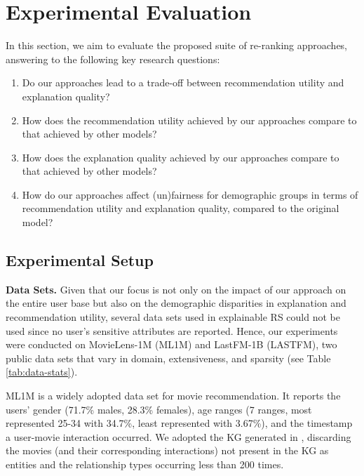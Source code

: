 \documentclass[sigconf]{acmart}
\def\threedigits#1{\number#1}
\begin{document}
\section{Experimental Evaluation}\label{sec:experiments}
In this section, we aim to evaluate the proposed suite of re-ranking approaches, answering to the following key research questions:

\begin{enumerate}[label={\textbf{RQ\protect\threedigits{\theenumi}}}, leftmargin=*]
    \item Do our approaches lead to a trade-off between recommendation utility and explanation quality?
    \item How does the recommendation utility achieved by our approaches compare to that achieved by other models?
    \item How does the explanation quality achieved by our approaches compare to that achieved by other models?
    \item How do our approaches affect (un)fairness for demographic groups in terms of recommendation utility and explanation quality, compared to the original model?
\end{enumerate}

\subsection{Experimental Setup}

\vspace{1mm}\noindent\textbf{Data Sets.} 
Given that our focus is not only on the impact of our approach on the entire user base but also on the demographic disparities in explanation and recommendation utility, several data sets used in explainable RS could not be used since no user's sensitive attributes are reported.
Hence, our experiments were conducted on MovieLens-1M (ML1M) and LastFM-1B (LASTFM), two public data sets that vary in domain, extensiveness, and sparsity (see Table \ref{tab:data-stats}). 

ML1M is a widely adopted data set for movie recommendation. It reports the users' gender (71.7\% males, 28.3\%  females), age ranges (7 ranges, most represented 25-34 with 34.7\%, least represented  with 3.67\%), and the timestamp a user-movie interaction occurred. 
We adopted the KG generated in \cite{CaoWHHC19}, discarding the movies (and their corresponding interactions) not present in the KG as entities and the relationship types occurring less than 200 times.   
\end{document}
